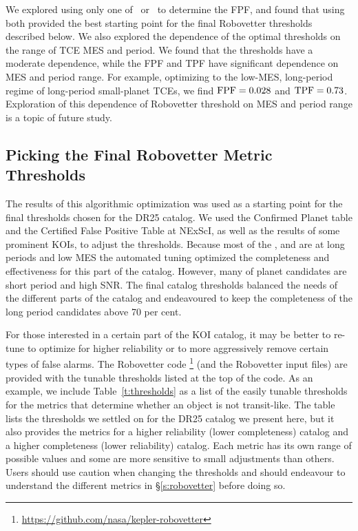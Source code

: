 We explored using only one of \scrtce\ or \invtce\ to determine the FPF, and found that using both provided the best starting point for the final Robovetter thresholds described below.  We also explored the dependence of the optimal thresholds on the range of TCE MES and period.  We found that the thresholds have a moderate dependence, while the FPF and TPF have significant dependence on MES and period range.  For example, optimizing to the low-MES, long-period regime of long-period small-planet TCEs,  we find ${\rm FPF} = 0.028$ and ${\rm TPF} = 0.73$.  Exploration of this dependence of Robovetter threshold on MES and period range is a topic of future study.

\subsection{Picking the Final Robovetter Metric Thresholds}

The results of this algorithmic optimization was used as a starting point for the final thresholds chosen for the DR25 catalog. We used the Confirmed Planet table and the Certified False Positive Table at NExScI, as well as the results of some prominent KOIs,  to adjust the thresholds.  Because most of the ,  and  are at long periods and low MES the automated tuning optimized the completeness and effectiveness for this part of the catalog. However, many of  planet candidates are short period and high SNR. The final catalog thresholds balanced the needs of the different parts of the catalog and endeavoured to keep the completeness of the long period candidates above 70 per cent.

For those interested in a certain part of the KOI catalog, it may be better to re-tune to optimize for higher reliability or to more aggressively remove certain types of false alarms.   The Robovetter code \footnote{\url{https://github.com/nasa/kepler-robovetter}} (and the Robovetter input files) are provided with the tunable thresholds listed at the top of the code.  As an example, we include Table~\ref{t:thresholds} as a list of the easily tunable thresholds for the metrics that determine whether an object is not transit-like.  The table lists the thresholds we settled on for the DR25 catalog we present here, but it also provides the metrics for a higher reliability (lower completeness) catalog and a higher completeness (lower reliability) catalog. Each metric has its own range of possible values and some are more sensitive to small adjustments than others.  Users should use caution when changing the thresholds and should endeavour to understand the different metrics in \S\ref{s:robovetter} before doing so.




